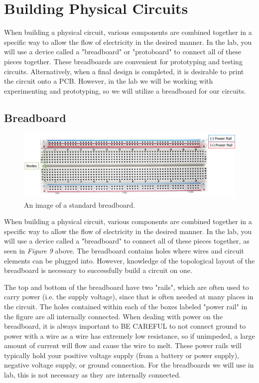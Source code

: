 \documentclass[12pt]{article}
\begin{document}
\section{Building Physical Circuits}

When building a physical circuit, various components are combined together in a specific way to allow the flow of electricity in the desired manner. In the lab, you will use a device called a "breadboard" or "protoboard" to connect all of these pieces together. These breadboards are convenient for prototyping and testing circuits. Alternatively, when a final design is completed, it is desirable to print the circuit onto a PCB. However, in the lab we will be working with experimenting and prototyping, so we will utilize a breadboard for our circuits. 

\subsection{Breadboard}

\begin{figure}[h]
    \centering
    \includegraphics[width=15cm]{photos/prelim/breadboard_labeled.png}
    \caption{An image of a standard breadboard.}
\end{figure}

When building a physical circuit, various components are combined together in a specific way to allow the flow of electricity in the desired manner. In the lab, you will use a device called a "breadboard" to connect all of these pieces together, as seen in \textit{Figure 9} above. The breadboard contains holes where wires and circuit elements can be plugged into. However, knowledge of the topological layout of the breadboard is necessary to successfully build a circuit on one.

The top and bottom of the breadboard have two "rails", which are often used to carry power (i.e. the supply voltage), since that is often needed at many places in the circuit. The holes contained within each of the boxes labeled "power rail" in the figure are all internally connected. When dealing with power on the breadboard, it is always important to BE CAREFUL to not connect ground to power with a wire as a wire has extremely low resistance, so if unimpeded, a large amount of current will flow and cause the wire to melt. These power rails will typically hold your positive voltage supply (from a battery or power supply), negative voltage supply, or ground connection. For the breadboards we will use in lab, this is not necessary as they are internally connected.
\end{document}
